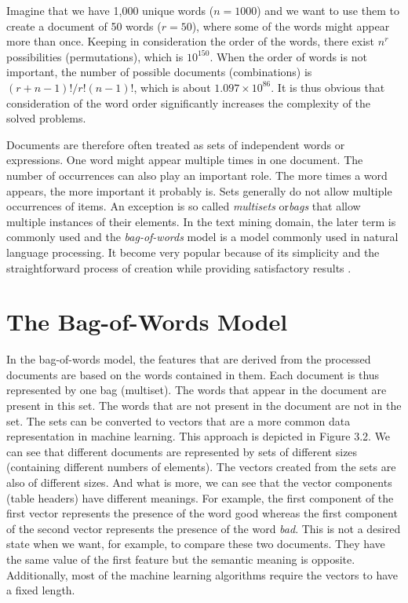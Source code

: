 Imagine that we have 1{,}000
unique words ($n = 1000$) and we want to use them to create a document of 50
words ($r = 50$), where some of the words might appear more than once. Keeping
in consideration the order of the words, there exist $n^r$ possibilities (permutations),
which is $10^{150}$. When the order of words is not important, the number of
possible documents (combinations) is ${(r + n - 1)!}/{r!(n - 1)!}$, which is about
$1.097 \times 10^{86}$. It is thus obvious that consideration of the word order significantly
increases the complexity of the solved problems.

Documents are therefore often treated as sets of independent words or expressions. One word might appear multiple times in one document. The number
of occurrences can also play an important role. The more times a word appears,
the more important it probably is. Sets generally do not allow multiple occurrences of items. An exception is so called \textit{multisets} or\textit{bags} that allow multiple
instances of their elements. In the text mining domain, the later term is commonly used and the \textit{bag-of-words} model is a model commonly used in natural
language processing. It become very popular because of its simplicity and the
straightforward process of creation while providing satisfactory results \cite{ref135}.

\section{The Bag-of-Words Model}

In the bag-of-words model, the features that are derived from the processed documents are based on the words contained in them. Each document is thus represented by one bag (multiset). The words that appear in the document are present
in this set. The words that are not present in the document are not in the set.
The sets can be converted to vectors that are a more common data representation in machine learning. This approach is depicted in Figure 3.2. We can see
that different documents are represented by sets of different sizes (containing
different numbers of elements). The vectors created from the sets are also of different sizes. And what is more, we can see that the vector components (table
headers) have different meanings. For example, the first component of the first
vector represents the presence of the word good whereas the first component of
the second vector represents the presence of the word \textit{bad}. This is not a desired
state when we want, for example, to compare these two documents. They have
the same value of the first feature but the semantic meaning is opposite. Additionally, most of the machine learning algorithms require the vectors to have a
fixed length.

